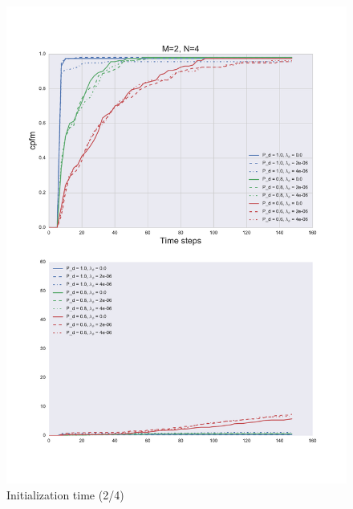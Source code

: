 {\begin{figure}
\centering
\includegraphics[height = .9\textheight]{Figures/plots/Scenario1_Init-Time(2-4).pdf}
\caption{Initialization time (2/4)}\label{fig:init_time_2-4}
\end{figure}

}
